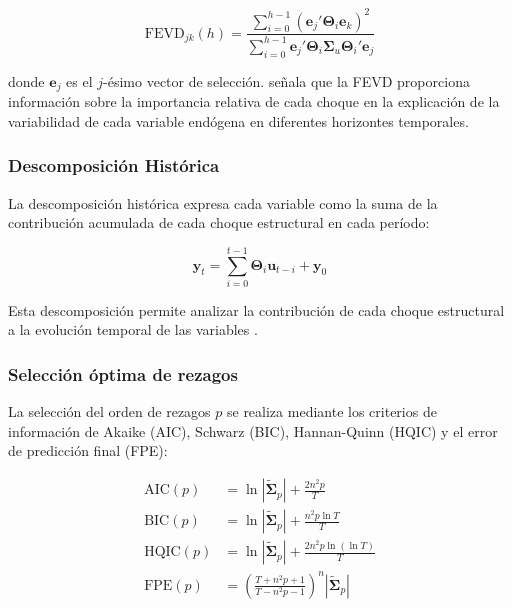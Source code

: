 \documentclass[12pt,a4paper]{article}
\begin{document}
\begin{equation}
\text{FEVD}_{jk}(h) = \frac{\sum_{i=0}^{h-1} (\mathbf{e}_j' \boldsymbol{\Theta}_i \mathbf{e}_k)^2}{\sum_{i=0}^{h-1} \mathbf{e}_j' \boldsymbol{\Theta}_i \boldsymbol{\Sigma}_u \boldsymbol{\Theta}_i' \mathbf{e}_j}
\label{eq:fevd}
\end{equation}

donde $\mathbf{e}_j$ es el $j$-ésimo vector de selección. \citet{enders2014} señala que la FEVD proporciona información sobre la importancia relativa de cada choque en la explicación de la variabilidad de cada variable endógena en diferentes horizontes temporales.

\subsubsection{Descomposición Histórica}

La descomposición histórica expresa cada variable como la suma de la contribución acumulada de cada choque estructural en cada período:

\begin{equation}
\mathbf{y}_t = \sum_{i=0}^{t-1} \boldsymbol{\Theta}_i \mathbf{u}_{t-i} + \mathbf{y}_0
\label{eq:hist}
\end{equation}

Esta descomposición permite analizar la contribución de cada choque estructural a la evolución temporal de las variables \citep{kilian2017, littlepohl2015}.

\subsubsection{Selección óptima de rezagos}

La selección del orden de rezagos $p$ se realiza mediante los criterios de información de Akaike (AIC), Schwarz (BIC), Hannan-Quinn (HQIC) y el error de predicción final (FPE):

\begin{align}
\text{AIC}(p) &= \ln|\tilde{\boldsymbol{\Sigma}}_p| + \frac{2n^2p}{T} \\
\text{BIC}(p) &= \ln|\tilde{\boldsymbol{\Sigma}}_p| + \frac{n^2p \ln T}{T} \\
\text{HQIC}(p) &= \ln|\tilde{\boldsymbol{\Sigma}}_p| + \frac{2n^2p \ln(\ln T)}{T} \\
\text{FPE}(p) &= \left(\frac{T + n^2p + 1}{T - n^2p - 1}\right)^n |\tilde{\boldsymbol{\Sigma}}_p|
\label{eq:criteria}
\end{align}
\end{document}
